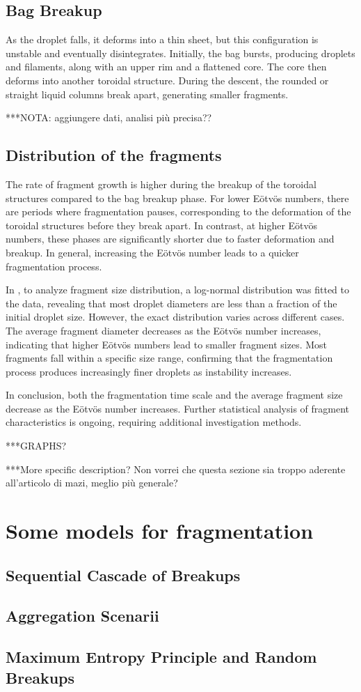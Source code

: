 \subsection{Bag Breakup}
As the droplet falls, it deforms into a thin sheet, but this configuration is unstable and eventually disintegrates. Initially, the bag bursts, producing droplets and filaments, along with an upper rim and a flattened core. The core then deforms into another toroidal structure. During the descent, the rounded or straight liquid columns break apart, generating smaller fragments.

***NOTA: aggiungere dati, analisi più precisa??
\subsection{Distribution of the fragments}

The rate of fragment growth is higher during the breakup of the toroidal structures compared to the bag breakup phase. For lower Eötvös numbers, there are periods where fragmentation pauses, corresponding to the deformation of the toroidal structures before they break apart. In contrast, at higher Eötvös numbers, these phases are significantly shorter due to faster deformation and breakup. In general, increasing the Eötvös number leads to a quicker fragmentation process.

In \cite{Mazi_article}, to analyze fragment size distribution, a log-normal distribution was fitted to the data, revealing that most droplet diameters are less than a fraction of the initial droplet size. However, the exact distribution varies across different cases. The average fragment diameter decreases as the Eötvös number increases, indicating that higher Eötvös numbers lead to smaller fragment sizes. Most fragments fall within a specific size range, confirming that the fragmentation process produces increasingly finer droplets as instability increases.

In conclusion, both the fragmentation time scale and the average fragment size decrease as the Eötvös number increases. Further statistical analysis of fragment characteristics is ongoing, requiring additional investigation methods.

***GRAPHS? 

***More specific description? Non vorrei che questa sezione sia troppo aderente all'articolo di mazi, meglio più generale? 


\section{Some models for fragmentation}
\subsection{Sequential Cascade of Breakups}
\subsection{Aggregation Scenarii}
\subsection{Maximum Entropy Principle and Random Breakups}